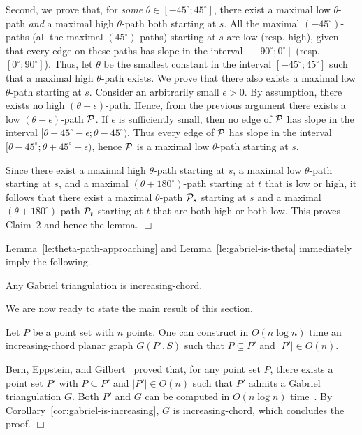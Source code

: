 \documentclass{llncs}
\renewenvironment{proof}
{{\bf Proof:}}{\hspace*{\fill}$\Box$\par\vspace{2mm}}
\begin{document}
\begin{proof}
Second, we prove that, for {\em some} $\theta\in[-45^\circ;45^\circ]$, there exist a maximal low $\theta$-path {\em and} a maximal high $\theta$-path both starting at $s$. All the maximal $(-45^\circ)$-paths (all the maximal $(45^\circ)$-paths) starting at $s$ are low (resp. high), given that every edge on these paths has slope in the interval $[-90^\circ;0^\circ]$ (resp. $[0^\circ;90^\circ]$). Thus, let $\theta$ be the smallest constant in the interval $[-45^\circ;45^\circ]$ such that a maximal high $\theta$-path exists. We prove that there also exists a maximal low $\theta$-path starting at $s$. Consider an arbitrarily small $\epsilon>0$. By assumption, there exists no high $(\theta-\epsilon)$-path. Hence, from the previous argument there exists a low $(\theta-\epsilon)$-path $\cal P$. If $\epsilon$ is sufficiently small, then no edge of $\cal P$ has slope in the interval $[\theta-45^\circ-\epsilon;\theta-45^\circ)$. Thus every edge of $\cal P$ has slope in the interval $[\theta-45^\circ;\theta+45^\circ-\epsilon)$, hence $\cal P$ is a maximal low $\theta$-path starting at $s$.

Since there exist a maximal high $\theta$-path starting at $s$, a maximal low $\theta$-path starting at $s$, and a maximal $(\theta+180^\circ)$-path starting at $t$ that is low or high, it follows that there exist a maximal $\theta$-path ${\cal P}_s$ starting at $s$ and a maximal $(\theta+180^\circ)$-path ${\cal P}_t$ starting at $t$ that are both high or both low. This proves Claim~2 and hence the lemma.
\end{proof}



Lemma~\ref{le:theta-path-approaching} and Lemma~\ref{le:gabriel-is-theta} immediately imply the following.

\begin{corollary}\label{cor:gabriel-is-increasing}
Any Gabriel triangulation is increasing-chord.
\end{corollary}

We are now ready to state the main result of this section.

\begin{theorem} \label{th:steiner}
Let $P$ be a point set with $n$ points.
One can construct in $O(n \log n)$ time an increasing-chord planar graph $G(P',S)$ such that $P\subseteq P'$ and $|P'|\in O(n)$.
\end{theorem}
\begin{proof}
Bern, Eppstein, and Gilbert~\cite{beg-pgmg-94} proved that, for any point set $P$, there exists a point set $P'$ with $P\subseteq P'$ and $|P'|\in O(n)$ such that $P'$ admits a Gabriel triangulation $G$. Both $P'$ and $G$ can be computed in $O(n \log n)$ time~\cite{beg-pgmg-94}. By Corollary~\ref{cor:gabriel-is-increasing}, $G$ is increasing-chord, which concludes the proof.
\end{proof}
\end{document}
